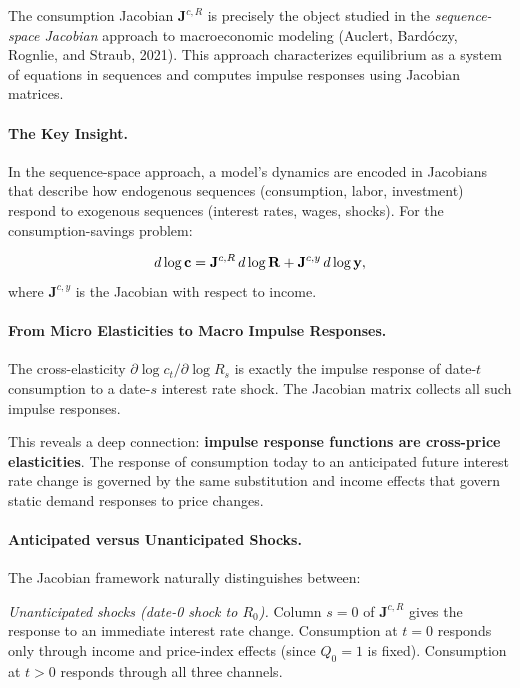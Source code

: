 The consumption Jacobian $\mathbf{J}^{c,R}$ is precisely the object studied in the \emph{sequence-space Jacobian} approach to macroeconomic modeling (Auclert, Bardóczy, Rognlie, and Straub, 2021). This approach characterizes equilibrium as a system of equations in sequences and computes impulse responses using Jacobian matrices.

\paragraph{The Key Insight.}
In the sequence-space approach, a model's dynamics are encoded in Jacobians that describe how endogenous sequences (consumption, labor, investment) respond to exogenous sequences (interest rates, wages, shocks). For the consumption-savings problem:

\begin{equation}
d \log \mathbf{c} = \mathbf{J}^{c,R} \, d \log \mathbf{R} + \mathbf{J}^{c,y} \, d \log \mathbf{y},
\label{eq:sequence-space-consumption}
\end{equation}
where $\mathbf{J}^{c,y}$ is the Jacobian with respect to income.

\paragraph{From Micro Elasticities to Macro Impulse Responses.}
The cross-elasticity $\partial \log c_t / \partial \log R_s$ is exactly the impulse response of date-$t$ consumption to a date-$s$ interest rate shock. The Jacobian matrix collects all such impulse responses.

This reveals a deep connection: \textbf{impulse response functions are cross-price elasticities}. The response of consumption today to an anticipated future interest rate change is governed by the same substitution and income effects that govern static demand responses to price changes.

\paragraph{Anticipated versus Unanticipated Shocks.}
The Jacobian framework naturally distinguishes between:

\medskip
\noindent
\textit{Unanticipated shocks (date-0 shock to $R_0$).} Column $s = 0$ of $\mathbf{J}^{c,R}$ gives the response to an immediate interest rate change. Consumption at $t = 0$ responds only through income and price-index effects (since $Q_0 = 1$ is fixed). Consumption at $t > 0$ responds through all three channels.

